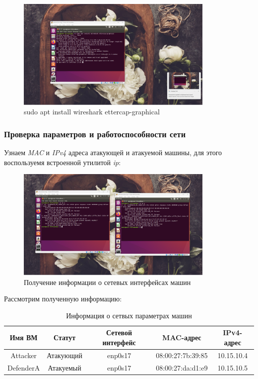 \documentclass[a4paper]{article}
\begin{document}
  \begin{figure}[H]
    \centering
    \includegraphics[width=0.85\textwidth]{02_00 (14)}
    \caption{sudo apt install wireshark ettercap-graphical}
    \label{img:0011}
  \end{figure}

  \subsubsection{Проверка параметров и работоспособности сети}

  Узнаем \textit{MAC} и \textit{IPv4} адреса атакующей и атакуемой машины, для этого воспользуемя 
  встроенной утилитой \textit{ip}:

  \begin{figure}[H]
    \centering
    \includegraphics[width=0.85\textwidth]{02_00 (15)}
    \caption{Получение информации о сетевых интерфейсах машин}
    \label{img:0012}
  \end{figure}

  Рассмотрим полученную информацию:

  \begin{table}[H]
    \centering
    \begin{tabular}{| c | c | c | c | c |}
      \hline
      Имя ВМ & Статут & Сетевой интерфейс & MAC-адрес & IPv4-адрес \\
      \hline
      Attacker & Атакующий & enp0s17 & 08:00:27:7b:39:85 & 10.15.10.4 \\
      \hline
      DefenderA & Атакуемый & enp0s17 & 08:00:27:da:d1:e9 & 10.15.10.5 \\
      \hline
    \end{tabular}
    \caption{Информация о сетвых параметрах машин}
  \end{table}
\end{document}
